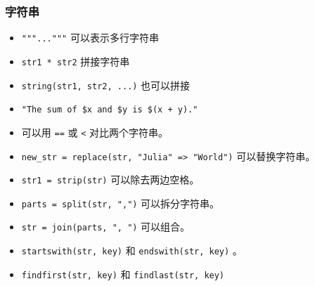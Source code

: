 \subsubsection{字符串}
\begin{itemize}
\item \verb`"""..."""` 可以表示多行字符串
\item \verb`str1 * str2` 拼接字符串
\item \verb`string(str1, str2, ...)` 也可以拼接
\item \verb`"The sum of $x and $y is $(x + y)."`
\item 可以用 \verb`==` 或 \verb`<` 对比两个字符串。
\item \verb`new_str = replace(str, "Julia" => "World")` 可以替换字符串。
\item \verb`str1 = strip(str)` 可以除去两边空格。
\item \verb`parts = split(str, ",")` 可以拆分字符串。
\item \verb`str = join(parts, ", ")` 可以组合。
\item \verb`startswith(str, key)` 和 \verb`endswith(str, key)` 。
\item \verb`findfirst(str, key)` 和 \verb`findlast(str, key)`
\end{itemize}

